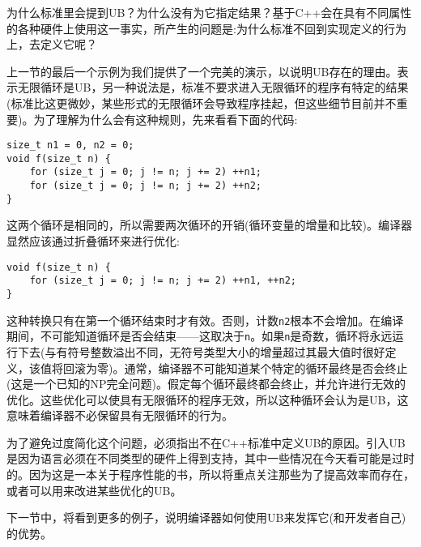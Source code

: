 为什么标准里会提到UB？为什么没有为它指定结果？基于C++会在具有不同属性的各种硬件上使用这一事实，所产生的问题是:为什么标准不回到实现定义的行为上，去定义它呢？

上一节的最后一个示例为我们提供了一个完美的演示，以说明UB存在的理由。表示无限循环是UB，另一种说法是，标准不要求进入无限循环的程序有特定的结果(标准比这更微妙，某些形式的无限循环会导致程序挂起，但这些细节目前并不重要)。为了理解为什么会有这种规则，先来看看下面的代码:

\begin{lstlisting}[style=styleCXX]
size_t n1 = 0, n2 = 0;
void f(size_t n) {
	for (size_t j = 0; j != n; j += 2) ++n1; 
	for (size_t j = 0; j != n; j += 2) ++n2;
}
\end{lstlisting}

这两个循环是相同的，所以需要两次循环的开销(循环变量的增量和比较)。编译器显然应该通过折叠循环来进行优化:

\begin{lstlisting}[style=styleCXX]
void f(size_t n) {
	for (size_t j = 0; j != n; j += 2) ++n1, ++n2;
}
\end{lstlisting}

这种转换只有在第一个循环结束时才有效。否则，计数\texttt{n2}根本不会增加。在编译期间，不可能知道循环是否会结束——这取决于\texttt{n}。如果\texttt{n}是奇数，循环将永远运行下去(与有符号整数溢出不同，无符号类型大小的增量超过其最大值时很好定义，该值将回滚为零)。通常，编译器不可能知道某个特定的循环最终是否会终止(这是一个已知的NP完全问题)。假定每个循环最终都会终止，并允许进行无效的优化。这些优化可以使具有无限循环的程序无效，所以这种循环会认为是UB，这意味着编译器不必保留具有无限循环的行为。

为了避免过度简化这个问题，必须指出不在C++标准中定义UB的原因。引入UB是因为语言必须在不同类型的硬件上得到支持，其中一些情况在今天看可能是过时的。因为这是一本关于程序性能的书，所以将重点关注那些为了提高效率而存在，或者可以用来改进某些优化的UB。

下一节中，将看到更多的例子，说明编译器如何使用UB来发挥它(和开发者自己)的优势。




































